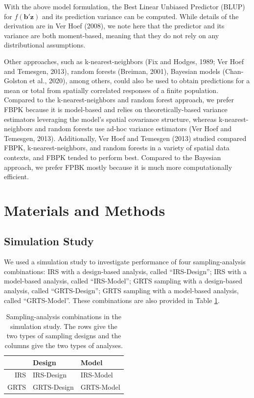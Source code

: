 \documentclass[]{elsarticle} %
\begin{document}
With the above model formulation, the Best Linear Unbiased Predictor
(BLUP) for \(f(\mathbf{b}'\mathbf{z})\) and its prediction variance can
be computed. While details of the derivation are in Ver Hoef (2008), we
note here that the predictor and its variance are both moment-based,
meaning that they do not rely on any distributional assumptions.

Other approaches, such as k-nearest-neighbors (Fix and Hodges, 1989; Ver
Hoef and Temesgen, 2013), random forests (Breiman, 2001), Bayesian
models (Chan-Golston et al., 2020), among others, could also be used to
obtain predictions for a mean or total from spatially correlated
responses of a finite population. Compared to the k-nearest-neighbors
and random forest approach, we prefer FBPK because it is model-based and
relies on theoretically-based variance estimators leveraging the model's
spatial covariance structure, whereas k-nearest-neighbors and random
forests use ad-hoc variance estimators (Ver Hoef and Temesgen, 2013).
Additionally, Ver Hoef and Temesgen (2013) studied compared FBPK,
k-nearest-neighbors, and random forests in a variety of spatial data
contexts, and FBPK tended to perform best. Compared to the Bayesian
approach, we prefer FPBK mostly because it is much more computationally
efficient.

\hypertarget{sec:mm}{%
\section{Materials and Methods}\label{sec:mm}}

\hypertarget{sec:mm_sim}{%
\subsection{Simulation Study}\label{sec:mm_sim}}

We used a simulation study to investigate performance of four
sampling-analysis combinations: IRS with a design-based analysis, called
``IRS-Design''; IRS with a model-based analysis, called ``IRS-Model'';
GRTS sampling with a design-based analysis, called ``GRTS-Design''; GRTS
sampling with a model-based analysis, called ``GRTS-Model''. These
combinations are also provided in Table \ref{tab:designanalysis}.

\begin{table}[ht]
\centering
\begin{tabular}{r|ll}
  \hline
 & Design & Model \\ 
  \hline
IRS & IRS-Design & IRS-Model \\ 
  GRTS & GRTS-Design & GRTS-Model \\ 
   \hline
\end{tabular}
\caption{\label{tab:designanalysis} Sampling-analysis combinations in the simulation study. The rows give the two types of sampling designs and the columns give the two types of analyses.} 
\end{table}
\end{document}
